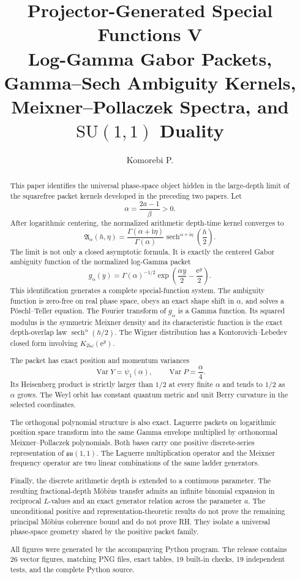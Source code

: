 \documentclass[11pt,openany]{report}
\title{\textbf{Projector-Generated Special Functions V}\\[0.25em]
\Large Log-Gamma Gabor Packets, Gamma--Sech Ambiguity Kernels, Meixner--Pollaczek Spectra, and $\mathrm{SU}(1,1)$ Duality}
\author{Komorebi P.}
\date{}
\theoremstyle{definition}
\theoremstyle{remark}
\newcommand{\e}{\mathrm e}
\newcommand{\ii}{\mathrm i}
\newcommand{\sech}{\operatorname{sech}}
\newcommand{\Agamma}{\mathfrak A}
\begin{document}
\hypersetup{pageanchor=false}
\maketitle

\begin{abstract}
This paper identifies the universal phase-space object hidden in the large-depth limit of the squarefree packet kernels developed in the preceding two papers. Let
\[
\alpha=\frac{2a-1}{\beta}>0.
\]
After logarithmic centering, the normalized arithmetic depth-time kernel converges to
\[
\boxed{
\Agamma_\alpha(h,\eta)
=
\frac{\Gamma(\alpha+\ii\eta)}{\Gamma(\alpha)}
\sech^{\alpha+\ii\eta}\!\left(\frac h2\right).
}
\]
The limit is not only a closed asymptotic formula. It is exactly the centered Gabor ambiguity function of the normalized log-Gamma packet
\[
g_\alpha(y)
=
\Gamma(\alpha)^{-1/2}
\exp\!\left(\frac{\alpha y}{2}-\frac{\e^y}{2}\right).
\]
This identification generates a complete special-function system. The ambiguity function is zero-free on real phase space, obeys an exact shape shift in $\alpha$, and solves a Pöschl--Teller equation. The Fourier transform of $g_\alpha$ is a Gamma function. Its squared modulus is the symmetric Meixner density and its characteristic function is the exact depth-overlap law $\sech^\alpha(h/2)$. The Wigner distribution has a Kontorovich--Lebedev closed form involving $K_{2\ii\omega}(\e^y)$.

The packet has exact position and momentum variances
\[
\operatorname{Var}Y=\psi_1(\alpha),
\qquad
\operatorname{Var}P=\frac\alpha4.
\]
Its Heisenberg product is strictly larger than $1/2$ at every finite $\alpha$ and tends to $1/2$ as $\alpha$ grows. The Weyl orbit has constant quantum metric and unit Berry curvature in the selected coordinates.

The orthogonal polynomial structure is also exact. Laguerre packets on logarithmic position space transform into the same Gamma envelope multiplied by orthonormal Meixner--Pollaczek polynomials. Both bases carry one positive discrete-series representation of $\mathfrak{su}(1,1)$. The Laguerre multiplication operator and the Meixner frequency operator are two linear combinations of the same ladder generators.

Finally, the discrete arithmetic depth is extended to a continuous parameter. The resulting fractional-depth Möbius transfer admits an infinite binomial expansion in reciprocal $L$-values and an exact generator relation across the parameter $a$. The unconditional positive and representation-theoretic results do not prove the remaining principal Möbius coherence bound and do not prove RH. They isolate a universal phase-space geometry shared by the positive packet family.

All figures were generated by the accompanying Python program. The release contains 26 vector figures, matching PNG files, exact tables, 19 built-in checks, 19 independent tests, and the complete Python source.
\end{abstract}
\end{document}

